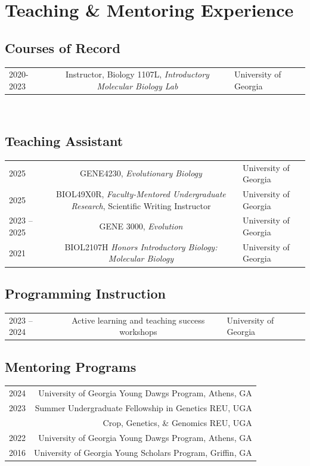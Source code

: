 \documentclass[letterpaper, 11pt]{article}
\begin{document}
\section*{Teaching \& Mentoring Experience}
\subsection*{Courses of Record}
\begin{tabular}{Y C L}
2020-2023 & Instructor, Biology 1107L, \textit{Introductory Molecular Biology Lab} & University of Georgia \\
\end{tabular}
\\
\subsection*{Teaching Assistant}
\begin{tabular}{Y C L}
2025 &GENE4230, \textit{Evolutionary Biology} & University of Georgia \\
2025 &BIOL49X0R, \textit{Faculty-Mentored Undergraduate Research}, Scientific Writing Instructor  & University of Georgia \\
2023 -- 2025 &GENE 3000, \textit{Evolution} & University of Georgia \\
2021 &BIOL2107H \textit{Honors Introductory Biology: Molecular Biology} & University of Georgia \\
\end{tabular}

\subsection*{Programming Instruction}
\begin{tabular}{Y C L}
2023 -- 2024 & Active learning and teaching success workshops & University of Georgia
\end{tabular}

\subsection*{Mentoring Programs}
 \begin{tabular}{DR}
  2024 & University of Georgia Young Dawgs Program, Athens, GA \\
 2023 & Summer Undergraduate Fellowship in Genetics REU, UGA \\
 &  Crop, Genetics, \& Genomics REU, UGA \\
 2022 & University of Georgia Young Dawgs Program, Athens, GA \\
 2016 &University of Georgia Young Scholars Program, Griffin, GA \\
 
 \end{tabular}
\end{document}
